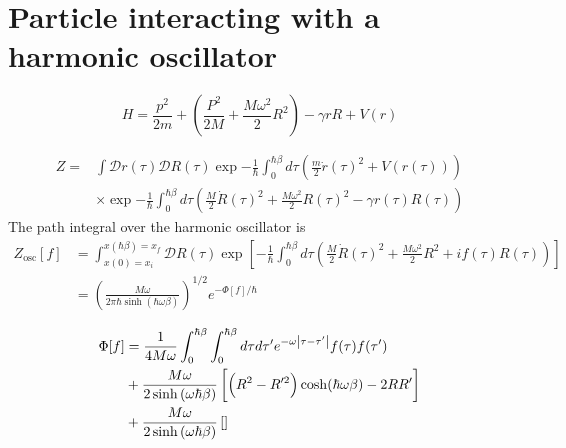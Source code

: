 \section{Particle interacting with a harmonic oscillator}

\begin{equation}
    H = \frac{p^2}{2m} + \left(\frac{P^2}{2M} + \frac{M\omega^2}{2}R^2\right) - \gamma r R + V(r)
\end{equation}

\begin{equation}
\begin{aligned}
    Z = &\int \mathcal{D}r(\tau) \mathcal{D}R(\tau) \exp{-\frac{1}{\hbar} \int_0^{\hbar\beta} d\tau \left(\frac{m}{2} \dot{r}(\tau)^2 + V(r(\tau))\right)} \\
    &\times \exp{-\frac{1}{\hbar}\int_0^{\hbar\beta} d\tau \left(\frac{M}{2}\dot{R}(\tau)^2 + \frac{M\omega^2}{2}R(\tau)^2 - \gamma r(\tau) R(\tau)\right)}
\end{aligned}
\end{equation}
The path integral over the harmonic oscillator is
\begin{equation}
\begin{aligned}
    Z_{\text{osc}}[f] &= \int_{x(0)=x_i}^{x(\hbar\beta)=x_f} \mathcal{D}R(\tau) \exp\left[-\frac{1}{\hbar}\int_0^{\hbar\beta}d\tau\left(\frac{M}{2}\dot{R}(\tau)^2 + \frac{M\omega^2}{2}R^2 + if(\tau)R(\tau)\right)\right] \\
    &= \left(\frac{M\omega}{2\pi\hbar \sinh\left(\hbar\omega\beta\right)}\right)^{1/2} e^{-\Phi[f]/\hbar}
\end{aligned}
\end{equation}

\begin{equation}
\begin{aligned}
    \Phi[f] &= \frac{1}{4M\omega} \int_0^{\hbar\beta}\int_0^{\hbar\beta} d\tau d\tau' e^{-\omega\abs{\tau-\tau'}} f(\tau)f(\tau') \\
    &+ \frac{M\omega}{2 \sinh\left(\omega\hbar\beta\right)} \left[\left(R^2-R'^2\right)\cosh(\hbar\omega\beta) - 2RR'\right] \\
    &+ \frac{M\omega}{2 \sinh\left(\omega\hbar\beta\right)} \left[\right]
\end{aligned}
\end{equation}